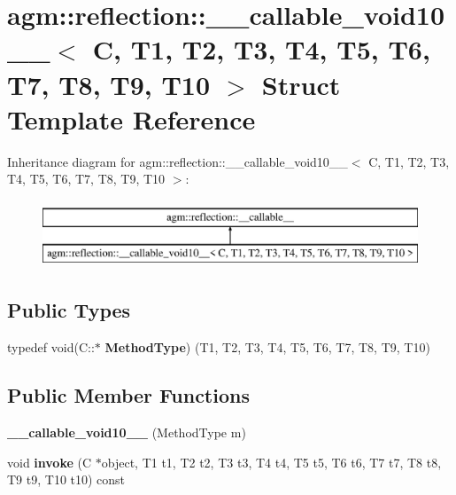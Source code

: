 \hypertarget{structagm_1_1reflection_1_1____callable__void10____}{}\section{agm\+:\+:reflection\+:\+:\+\_\+\+\_\+callable\+\_\+void10\+\_\+\+\_\+$<$ C, T1, T2, T3, T4, T5, T6, T7, T8, T9, T10 $>$ Struct Template Reference}
\label{structagm_1_1reflection_1_1____callable__void10____}
Inheritance diagram for agm\+:\+:reflection\+:\+:\+\_\+\+\_\+callable\+\_\+void10\+\_\+\+\_\+$<$ C, T1, T2, T3, T4, T5, T6, T7, T8, T9, T10 $>$\+:\begin{figure}[H]
\begin{center}
\leavevmode
\includegraphics[height=2.000000cm]{structagm_1_1reflection_1_1____callable__void10____}
\end{center}
\end{figure}
\subsection*{Public Types}
\begin{DoxyCompactItemize}
\item 
typedef void(C\+::$\ast$ {\bfseries Method\+Type}) (T1, T2, T3, T4, T5, T6, T7, T8, T9, T10)\hypertarget{structagm_1_1reflection_1_1____callable__void10_____ae1e6f43b33681d735b6474667f4ee16d}{}\label{structagm_1_1reflection_1_1____callable__void10_____ae1e6f43b33681d735b6474667f4ee16d}

\end{DoxyCompactItemize}
\subsection*{Public Member Functions}
\begin{DoxyCompactItemize}
\item 
{\bfseries \+\_\+\+\_\+callable\+\_\+void10\+\_\+\+\_\+} (Method\+Type m)\hypertarget{structagm_1_1reflection_1_1____callable__void10_____ac829bf9ce9bb97b68d521ceb594dd655}{}\label{structagm_1_1reflection_1_1____callable__void10_____ac829bf9ce9bb97b68d521ceb594dd655}

\item 
void {\bfseries invoke} (C $\ast$object, T1 t1, T2 t2, T3 t3, T4 t4, T5 t5, T6 t6, T7 t7, T8 t8, T9 t9, T10 t10) const \hypertarget{structagm_1_1reflection_1_1____callable__void10_____ac534d5dbe0c4331453105601ca2f3cb4}{}\label{structagm_1_1reflection_1_1____callable__void10_____ac534d5dbe0c4331453105601ca2f3cb4}

\end{DoxyCompactItemize}
